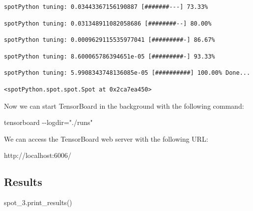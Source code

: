 \documentclass[
  letterpaper,
  DIV=11,
  numbers=noendperiod]{scrreprt}
\newenvironment{Shaded}{\begin{snugshade}}{\end{snugshade}}
\newcommand{\NormalTok}[1]{\textcolor[rgb]{0.00,0.23,0.31}{#1}}
\begin{document}
\begin{verbatim}
spotPython tuning: 0.03443367156190887 [#######---] 73.33% 
\end{verbatim}

\begin{verbatim}
spotPython tuning: 0.031348911082058686 [########--] 80.00% 
\end{verbatim}

\begin{verbatim}
spotPython tuning: 0.0009629115535977041 [#########-] 86.67% 
\end{verbatim}

\begin{verbatim}
spotPython tuning: 8.600065786394651e-05 [#########-] 93.33% 
\end{verbatim}

\begin{verbatim}
spotPython tuning: 5.9908343748136085e-05 [##########] 100.00% Done...
\end{verbatim}

\begin{verbatim}
<spotPython.spot.spot.Spot at 0x2ca7ea450>
\end{verbatim}

Now we can start TensorBoard in the background with the following
command:

\begin{Shaded}
\begin{Highlighting}[]
\NormalTok{tensorboard {-}{-}logdir="./runs"}
\end{Highlighting}
\end{Shaded}

We can access the TensorBoard web server with the following URL:

\begin{Shaded}
\begin{Highlighting}[]
\NormalTok{http://localhost:6006/}
\end{Highlighting}
\end{Shaded}

\hypertarget{results}{%
\subsection{Results}\label{results}}

\begin{Shaded}
\begin{Highlighting}[]
\NormalTok{spot\_3.print\_results()}
\end{Highlighting}
\end{Shaded}
\end{document}
